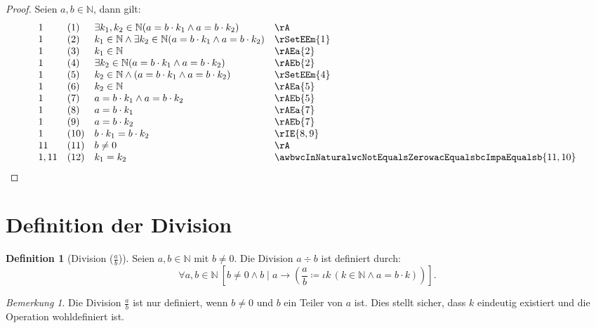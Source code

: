 \documentclass{book}
\theoremstyle{plain}
\theoremstyle{remark}
\newtheorem*{remark}{Bemerkung}
\theoremstyle{definition}
\newtheorem{definition}{Definition}[section]
\begin{document}
\begin{proof}
Seien \( a, b \in \mathbb{N} \), dann gilt:
\[
\begin{array}{llll}
    1 & (1) & \exists k_1, k_2 \in \mathbb{N} (a = b \cdot k_1 \land a = b \cdot k_2) & \rA \\
    1  & (2) & k_1 \in \mathbb{N} \land \exists k_2 \in \mathbb{N} (a = b \cdot k_1 \land a = b \cdot k_2) & \rSetEEm{1} \\
    1 & (3) & k_1 \in \mathbb{N} & \rAEa{2} \\
    1 & (4) & \exists k_2 \in \mathbb{N} (a = b \cdot k_1 \land a = b \cdot k_2) & \rAEb{2} \\
    1 & (5) & k_2 \in \mathbb{N} \land (a = b \cdot k_1 \land a = b \cdot k_2) & \rSetEEm{4} \\
    1 & (6) & k_2 \in \mathbb{N} & \rAEa{5} \\
    1 & (7) & a = b \cdot k_1 \land a = b \cdot k_2 & \rAEb{5} \\
    1 & (8) & a = b \cdot k_1 & \rAEa{7} \\
    1 & (9) & a = b \cdot k_2 & \rAEb{7} \\
    1 & (10) & b \cdot k_1 = b \cdot k_2 & \rIE{8,9} \\
    11 & (11) & b\neq 0 & \rA \\
    1,11 & (12) & k_1 = k_2 & \awbwcInNaturalwcNotEqualsZerowacEqualsbcImpaEqualsb{11,10} \\
\end{array}
\]
\end{proof}

\section{Definition der Division}

\begin{definition}[Division (\( \frac{a}{b} \))]
Seien \( a, b \in \mathbb{N} \) mit \( b \neq 0 \). Die Division \( a \div b \) ist definiert durch:
\[
\forall a, b \in \mathbb{N} \ [b \neq 0 \land b \mid a \rightarrow (\frac{a}{b} \coloneqq \iota k \, (k \in \mathbb{N} \land a = b \cdot k))].
\]
\end{definition}

\begin{remark}
Die Division \( \frac{a}{b} \) ist nur definiert, wenn \( b \neq 0 \) und \( b \) ein Teiler von \( a \) ist. Dies stellt sicher, dass \( k \) eindeutig existiert und die Operation wohldefiniert ist.
\end{remark}
\end{document}
